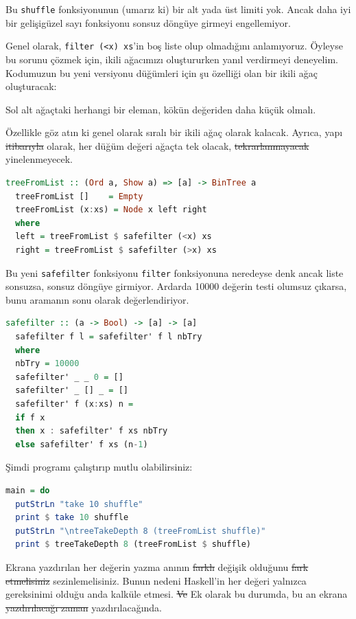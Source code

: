\documentclass[a4paper,14pt,openany]{extbook} %
\begin{document}
Bu \lstinline!shuffle! fonksiyonunun (umarız ki) bir alt yada üst limiti
yok. Ancak daha iyi bir gelişigüzel sayı fonksiyonu sonsuz döngüye girmeyi
engellemiyor.

Genel olarak, \lstinline!filter (<x) xs!'in boş liste olup olmadığını
anlamıyoruz. Öyleyse bu sorunu çözmek için, ikili ağacımızı oluştururken
yanıl verdirmeyi deneyelim. Kodumuzun bu yeni versiyonu düğümleri için şu
özelliği olan bir ikili ağaç oluşturacak:

Sol alt ağaçtaki herhangi bir eleman, kökün değeriden daha küçük olmalı.

Özellikle göz atın ki genel olarak sıralı bir ikili ağaç olarak kalacak.
Ayrıca, yapı \st{itibarıyla} olarak, her düğüm değeri ağaçta tek olacak,
\st{tekrarlanmayacak} yinelenmeyecek.

\begin{lstlisting}[language=Haskell]
  treeFromList :: (Ord a, Show a) => [a] -> BinTree a
  treeFromList []    = Empty
  treeFromList (x:xs) = Node x left right
  where
  left = treeFromList $ safefilter (<x) xs
  right = treeFromList $ safefilter (>x) xs
\end{lstlisting}

Bu yeni \lstinline!safefilter! fonksiyonu \lstinline!filter!
fonksiyonuna neredeyse denk ancak liste sonsuzsa, sonsuz döngüye
girmiyor. Ardarda 10000 değerin testi olumsuz çıkarsa, bunu
aramanın sonu olarak değerlendiriyor.

\begin{lstlisting}[language=Haskell]
  safefilter :: (a -> Bool) -> [a] -> [a]
  safefilter f l = safefilter' f l nbTry
  where
  nbTry = 10000
  safefilter' _ _ 0 = []
  safefilter' _ [] _ = []
  safefilter' f (x:xs) n =
  if f x
  then x : safefilter' f xs nbTry
  else safefilter' f xs (n-1)
\end{lstlisting}

Şimdi programı çalıştırıp mutlu olabilirsiniz:

\begin{lstlisting}[language=Haskell]
  main = do
  putStrLn "take 10 shuffle"
  print $ take 10 shuffle
  putStrLn "\ntreeTakeDepth 8 (treeFromList shuffle)"
  print $ treeTakeDepth 8 (treeFromList $ shuffle)
\end{lstlisting}

Ekrana yazdırılan her değerin yazma anının \st{farklı} değişik olduğunu \st{fark
etmelisiniz} sezinlemelisiniz. Bunun nedeni Haskell'in her değeri yalnızca gereksinimi olduğu
anda kalküle etmesi. \st{Ve} Ek olarak bu durumda, bu an ekrana \st{ yazdırılacağı zaman} yazdırılacağında.
\end{document}
